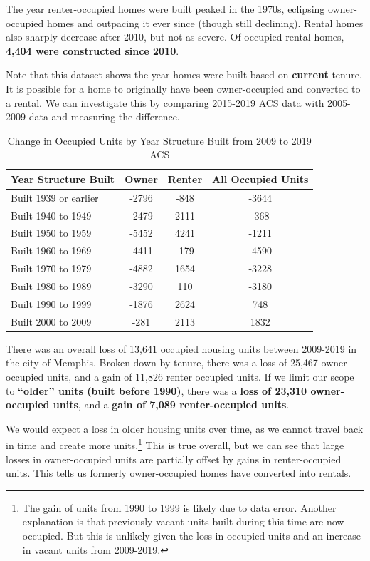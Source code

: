 \documentclass[
]{book}
\begin{document}
The year renter-occupied homes were built peaked in the 1970s, eclipsing owner-occupied homes and outpacing it ever since (though still declining). Rental homes also sharply decrease after 2010, but not as severe. Of occupied rental homes, \textbf{4,404 were constructed since 2010}.

Note that this dataset shows the year homes were built based on \textbf{current} tenure. It is possible for a home to originally have been owner-occupied and converted to a rental. We can investigate this by comparing 2015-2019 ACS data with 2005-2009 data and measuring the difference.

\begin{table}

\caption{\label{tab:tbl-yrblt-diff}Change in Occupied Units by Year Structure Built from 2009 to 2019 ACS}
\centering
\begin{tabular}[t]{l|c|c|c}
\hline
Year Structure Built & Owner & Renter & All Occupied Units\\
\hline
Built 1939 or earlier & -2796 & -848 & -3644\\
\hline
Built 1940 to 1949 & -2479 & 2111 & -368\\
\hline
Built 1950 to 1959 & -5452 & 4241 & -1211\\
\hline
Built 1960 to 1969 & -4411 & -179 & -4590\\
\hline
Built 1970 to 1979 & -4882 & 1654 & -3228\\
\hline
Built 1980 to 1989 & -3290 & 110 & -3180\\
\hline
Built 1990 to 1999 & -1876 & 2624 & 748\\
\hline
Built 2000 to 2009 & -281 & 2113 & 1832\\
\hline
\end{tabular}
\end{table}

There was an overall loss of 13,641 occupied housing units between 2009-2019 in the city of Memphis. Broken down by tenure, there was a loss of 25,467 owner-occupied units, and a gain of 11,826 renter occupied units. If we limit our scope to \textbf{``older'' units (built before 1990)}, there was a \textbf{loss of 23,310 owner-occupied units}, and a \textbf{gain of 7,089 renter-occupied units}.

We would expect a loss in older housing units over time, as we cannot travel back in time and create more units.\footnote{The gain of units from 1990 to 1999 is likely due to data error. Another explanation is that previously vacant units built during this time are now occupied. But this is unlikely given the loss in occupied units and an increase in vacant units from 2009-2019.} This is true overall, but we can see that large losses in owner-occupied units are partially offset by gains in renter-occupied units. This tells us formerly owner-occupied homes have converted into rentals.
\end{document}
